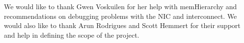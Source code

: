 We would like to thank Gwen Voskuilen for her help with memHierarchy and
recommendations on debugging problems with the NIC and interconnect. We would
also like to thank Arun Rodrigues and Scott Hemmert for their support and help
in defining the scope of the project.

